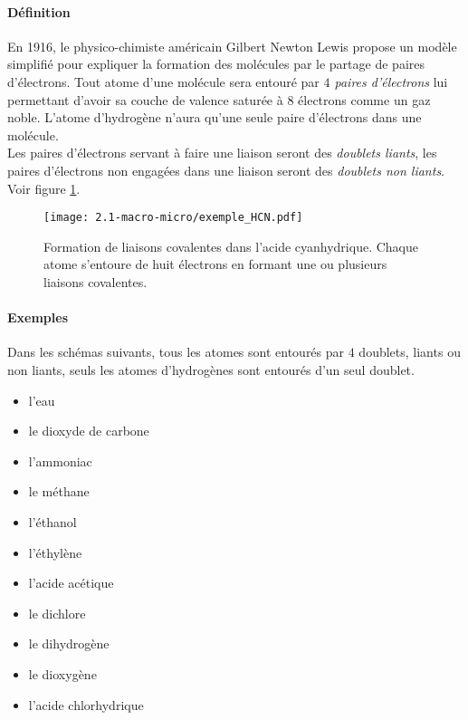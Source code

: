 \paragraph{Définition} En 1916, le physico-chimiste américain Gilbert Newton Lewis propose un modèle simplifié pour expliquer la formation des molécules par le
partage de paires d'électrons. Tout atome d'une molécule sera entouré par \textit{$4$ paires d'électrons} lui permettant d'avoir sa couche de valence 
saturée à $8$ électrons comme un gaz noble. L'atome d'hydrogène n'aura qu'une seule paire d'électrons dans une molécule.\\ 
Les paires d'électrons servant à faire une liaison seront des \textit{doublets liants}, les paires d'électrons non engagées
dans une liaison seront des \textit{doublets non liants}. Voir figure \ref{fig:exemple_hcn}.
\begin{figure}[!h]
  \begin{center}
      \texttt{[image: 2.1-macro-micro/exemple\_HCN.pdf]}
  \end{center}
  \caption{Formation de liaisons covalentes dans l'acide cyanhydrique. Chaque atome s'entoure de huit électrons en formant une ou plusieurs liaisons covalentes. }
  \label{fig:exemple_hcn}
\end{figure}
\paragraph{Exemples} Dans les schémas suivants, tous les atomes sont entourés par $4$ doublets, liants ou non liants, seuls les atomes
d'hydrogènes sont entourés d'un seul doublet.
\begin{itemize}
 \item l'eau  
 \item le dioxyde de carbone 
 \item l'ammoniac 
 \item le méthane 
 \item l'éthanol 
 \item l'éthylène 
 \item l'acide acétique 
 \item le dichlore 
 \item le dihydrogène 
 \item le dioxygène 
 \item l'acide chlorhydrique 
\end{itemize}



